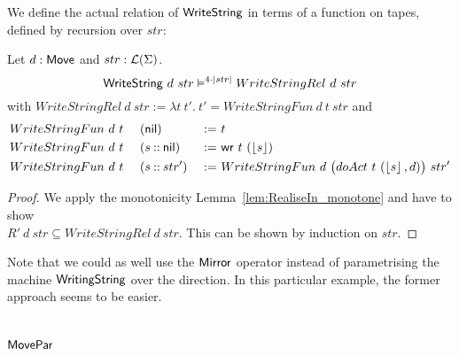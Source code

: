 We define the actual relation of $\mathsf{WriteString}$ in terms of a function on tapes, defined by recursion over $str$:
\begin{lemma}
  \label{lem:WriteString_Sem}
  Let $d:\mathsf{Move}$ and $str:\mathcal{L}(\Sigma)$.
  \[ \mathsf{WriteString}~d~str \mathrel{\vDash^{4\cdot\left| str \right|}} WriteStringRel~d~str \]
  with
  $WriteStringRel~d~str := \lambda t~t'.~t' = WriteStringFun~d~t~str$ and
  \begin{alignat*}{3}
    &WriteStringFun~d~t~&&(\mathsf{nil}        ) &~:=~& t \\
    &WriteStringFun~d~t~&&(s \mathbin{::} \mathsf{nil}) &~:=~& \mathsf{wr}~t~(\left\lfloor {s} \right\rfloor) \\
    &WriteStringFun~d~t~&&(s \mathbin{::} str') &~:=~& WriteStringFun~d~\bigl(doAct~t~(\left\lfloor {s} \right\rfloor, d)\bigr)~str'
  \end{alignat*}
\end{lemma}
\begin{proof}
  We apply the monotonicity Lemma~\ref{lem:RealiseIn_monotone} and have to show\\
  $R'~d~str \subseteq WriteStringRel~d~str$.  This can be shown by induction on $str$.
\end{proof}

Note that we could as well use the $\mathsf{Mirror}$ operator instead of parametrising the machine $\mathsf{WritingString}$ over the direction.  In this
particular example, the former approach seems to be easier.

\section{$\mathsf{MovePar}$}
\label{sec:MovePar}

